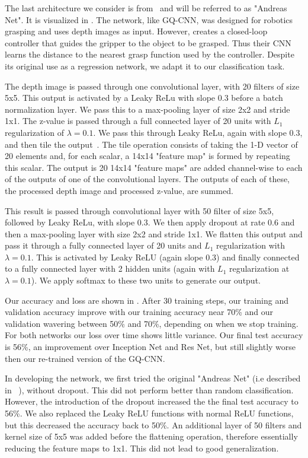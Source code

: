 The last architecture we consider is from~\cite{viereck2017learning} and will be referred to as "Andreas Net". 
It is visualized in . 
The network, like GQ-CNN, was designed for robotics grasping and uses depth images as input. 
However, \cite{viereck2017learning} creates a closed-loop controller that guides the gripper to the object to be grasped. 
Thus their CNN learns the distance to the nearest grasp function used by the controller. 
Despite its original use as a regression network, we adapt it to our classification task. 

The depth image is passed through one convolutional layer, with 20 filters of size 5x5. 
This output is activated by a Leaky ReLu with slope 0.3 before a batch normalization layer. 
We pass this to a max-pooling layer of size 2x2 and stride 1x1. 
The z-value is passed through a full connected layer of 20 units with $L_{1}$ regularization of $\lambda=0.1$.
We pass this through Leaky ReLu, again with slope 0.3, and then tile the output~\cite{ngiam2010tiled}.
The tile operation consists of taking the 1-D vector of 20 elements and, for each scalar, a 14x14 "feature map" is formed by repeating this scalar. 
The output is 20 14x14 "feature maps" are added channel-wise to each of the outputs of one of the convolutional layers.
The outputs of each of these, the processed depth image and processed z-value, are summed.

This result is passed through convolutional layer with 50 filter of size 5x5, followed by Leaky ReLu, with slope 0.3. 
We then apply dropout at rate 0.6 and then a max-pooling layer with size 2x2 and stride 1x1. 
We flatten this output and pass it through a fully connected layer of 20 units and $L_{1}$ regularization with $\lambda = 0.1$. 
This is activated by Leaky ReLU (again slope 0.3) and finally connected to a fully connected layer with 2 hidden units (again with $L_{1}$ regularization at $\lambda=0.1$). 
We apply softmax to these two units to generate our output. 

Our accuracy and loss are shown in . 
After 30 training steps, our training and validation accuracy improve with our training accuracy near 70\% and our validation wavering between 50\% and 70\%, depending on when we stop training. 
For both networks our loss over time shows little variance. 
Our final test accuracy is 56\%, an improvement over Inception Net and Res Net, but still slightly worse then our re-trained version of the GQ-CNN. 

In developing the network, we first tried the original "Andreas Net" (i.e described in ~\cite{viereck2017learning}), without dropout. 
This did not perform better than random classification. 
However, the introduction of the dropout increased the the final test accuracy to 56\%. 
We also replaced the Leaky ReLU functions with normal ReLU functions, but this decreased the accuracy back to 50\%. 
An additional layer of 50 filters and kernel size of 5x5 was added before the flattening operation, therefore essentially reducing the feature maps to 1x1.  
This did not lead to good generalization. 

